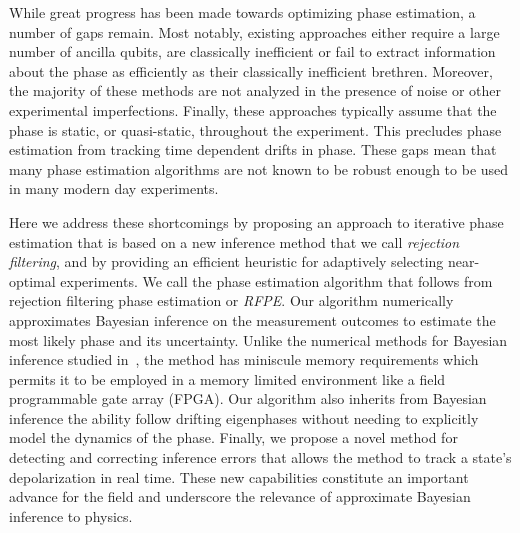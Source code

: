\documentclass[aps,pra,amsmath,twocolumn,amssymb,superscriptaddress]{revtex4-1}
\begin{document}
While great progress has been made towards optimizing phase estimation, a number of gaps remain.  Most notably, existing approaches either require a large number of ancilla qubits, are classically inefficient or fail to extract information about the phase as efficiently as their classically inefficient brethren.  Moreover, the majority of these methods are not analyzed in the presence of noise or other experimental imperfections.  Finally, these approaches typically assume that the phase is static, or quasi-static, throughout the experiment.  This precludes phase estimation from tracking time dependent drifts in phase.  These gaps mean that many phase estimation algorithms are not known to be robust enough to be used in many modern day experiments.


Here we address these shortcomings by proposing an approach to iterative phase estimation that is based on a new inference method that we call \emph{rejection filtering}, and by providing an efficient heuristic for adaptively selecting near-optimal experiments. We call the phase estimation algorithm that follows from rejection filtering phase estimation or \emph{RFPE}.  Our algorithm numerically approximates Bayesian inference on the measurement outcomes to estimate the most likely phase and its uncertainty.  Unlike the numerical methods for Bayesian inference studied in~\cite{granade_robust_2012, stenberg_efficient_2014}, the method has miniscule memory requirements which permits it to be employed in a memory limited environment like a field programmable gate array (FPGA).  Our algorithm also inherits from Bayesian inference the ability follow drifting eigenphases without needing to explicitly model the dynamics of the phase.  Finally, we propose a novel method for detecting and correcting inference errors that allows the method to track a state's depolarization in real time.  These new capabilities constitute an important advance for the field and underscore the relevance of approximate Bayesian inference to physics.
%
\end{document}

